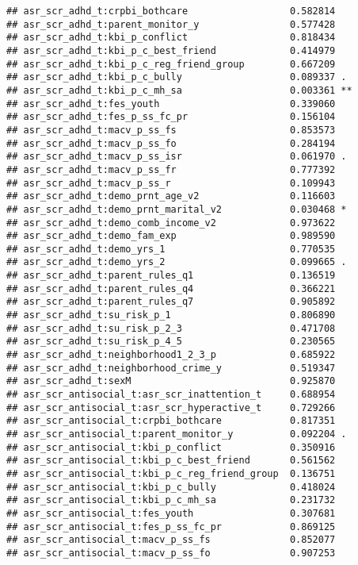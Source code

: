 \documentclass[
]{article}
\begin{document}
\begin{verbatim}
## asr_scr_adhd_t:crpbi_bothcare                  0.582814    
## asr_scr_adhd_t:parent_monitor_y                0.577428    
## asr_scr_adhd_t:kbi_p_conflict                  0.818434    
## asr_scr_adhd_t:kbi_p_c_best_friend             0.414979    
## asr_scr_adhd_t:kbi_p_c_reg_friend_group        0.667209    
## asr_scr_adhd_t:kbi_p_c_bully                   0.089337 .  
## asr_scr_adhd_t:kbi_p_c_mh_sa                   0.003361 ** 
## asr_scr_adhd_t:fes_youth                       0.339060    
## asr_scr_adhd_t:fes_p_ss_fc_pr                  0.156104    
## asr_scr_adhd_t:macv_p_ss_fs                    0.853573    
## asr_scr_adhd_t:macv_p_ss_fo                    0.284194    
## asr_scr_adhd_t:macv_p_ss_isr                   0.061970 .  
## asr_scr_adhd_t:macv_p_ss_fr                    0.777392    
## asr_scr_adhd_t:macv_p_ss_r                     0.109943    
## asr_scr_adhd_t:demo_prnt_age_v2                0.116603    
## asr_scr_adhd_t:demo_prnt_marital_v2            0.030468 *  
## asr_scr_adhd_t:demo_comb_income_v2             0.973622    
## asr_scr_adhd_t:demo_fam_exp                    0.989590    
## asr_scr_adhd_t:demo_yrs_1                      0.770535    
## asr_scr_adhd_t:demo_yrs_2                      0.099665 .  
## asr_scr_adhd_t:parent_rules_q1                 0.136519    
## asr_scr_adhd_t:parent_rules_q4                 0.366221    
## asr_scr_adhd_t:parent_rules_q7                 0.905892    
## asr_scr_adhd_t:su_risk_p_1                     0.806890    
## asr_scr_adhd_t:su_risk_p_2_3                   0.471708    
## asr_scr_adhd_t:su_risk_p_4_5                   0.230565    
## asr_scr_adhd_t:neighborhood1_2_3_p             0.685922    
## asr_scr_adhd_t:neighborhood_crime_y            0.519347    
## asr_scr_adhd_t:sexM                            0.925870    
## asr_scr_antisocial_t:asr_scr_inattention_t     0.688954    
## asr_scr_antisocial_t:asr_scr_hyperactive_t     0.729266    
## asr_scr_antisocial_t:crpbi_bothcare            0.817351    
## asr_scr_antisocial_t:parent_monitor_y          0.092204 .  
## asr_scr_antisocial_t:kbi_p_conflict            0.350916    
## asr_scr_antisocial_t:kbi_p_c_best_friend       0.561562    
## asr_scr_antisocial_t:kbi_p_c_reg_friend_group  0.136751    
## asr_scr_antisocial_t:kbi_p_c_bully             0.418024    
## asr_scr_antisocial_t:kbi_p_c_mh_sa             0.231732    
## asr_scr_antisocial_t:fes_youth                 0.307681    
## asr_scr_antisocial_t:fes_p_ss_fc_pr            0.869125    
## asr_scr_antisocial_t:macv_p_ss_fs              0.852077    
## asr_scr_antisocial_t:macv_p_ss_fo              0.907253    

\end{verbatim}
\end{document}
